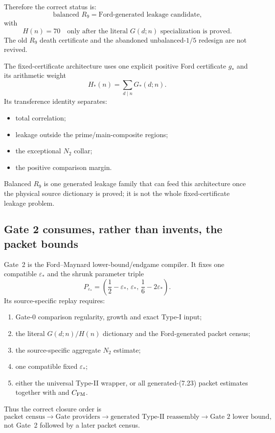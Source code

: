 \documentclass[11pt]{article}
\theoremstyle{definition}
\newcommand{\1}{\mathbf 1}
\begin{document}
Therefore the correct status is:
\[
\boxed{
\text{balanced }R_9
=
\text{Ford-generated leakage candidate,}
}
\]
with
\[
\boxed{
H(n)=70
\quad\text{only after the literal }G(d;n)\text{ specialization is proved.}
}
\]
The old $R_9$ death certificate and the abandoned unbalanced-$1/5$ redesign are not
revived.

The fixed-certificate architecture uses one explicit positive Ford certificate $g_\ast$
and its arithmetic weight
\[
H_\ast(n)=\sum_{d\mid n}G_\ast(d;n).
\]
Its transference identity separates:
\begin{itemize}[leftmargin=1.6em]
\item total correlation;
\item leakage outside the prime/main-composite regions;
\item the exceptional $N_2$ collar;
\item the positive comparison margin.
\end{itemize}
Balanced $R_9$ is one generated leakage family that can feed this architecture once the
physical source dictionary is proved; it is not the whole fixed-certificate leakage
problem.

\subsection{Gate 2 consumes, rather than invents, the packet bounds}

Gate~2 is the Ford--Maynard lower-bound/endgame compiler.  It fixes one compatible
$\varepsilon_\ast$ and the shrunk parameter triple
\[
P_{\varepsilon_\ast}
=
\left(
\frac12-\varepsilon_\ast,\,
\varepsilon_\ast,\,
\frac16-2\varepsilon_\ast
\right).
\]
Its source-specific replay requires:
\begin{enumerate}[leftmargin=1.7em]
\item Gate-0 comparison regularity, growth and exact Type-I input;
\item the literal $G(d;n)/H(n)$ dictionary and the Ford-generated packet census;
\item the source-specific aggregate $N_2$ estimate;
\item one compatible fixed $\varepsilon_\ast$;
\item either the universal Type-II wrapper, or all generated-(7.23) packet estimates
  together with  and $C_{\rm FM}$.
\end{enumerate}
Thus the correct closure order is
\[
\text{packet census}
\to
\text{Gate providers}
\to
\text{generated Type-II reassembly}
\to
\text{Gate 2 lower bound},
\]
not Gate~2 followed by a later packet census.
\end{document}
